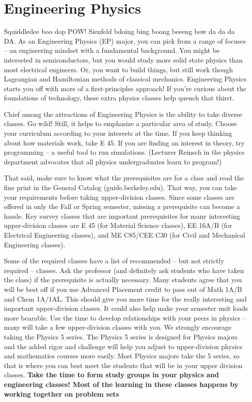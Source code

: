 \chapter*{Engineering Physics}

Squiddledee boo dop POW!  Sienfeld bdoing bing boong beeeng bow da da da DA.  As an Engineering Physics (EP) major, you can pick from a range of focuses – an engineering mindset with a fundamental background. You might be interested in semiconductors, but you would study more solid state physics than most electrical engineers. Or, you want to build things, but still work though Lagrangian and Hamiltonian methods of classical mechanics. Engineering Physics starts you off with more of a first-principles approach! If you’re curious about the foundations of technology, these extra physics classes help quench that thirst.

Chief among the attractions of Engineering Physics is the ability to take diverse classes. Go wild! Still, it helps to emphasize a particular area of study. Choose your curriculum according to your interests at the time. If you keep thinking about how materials work, take E 45. If you are finding an interest in theory, try programming – a useful tool to run simulations. (Lecturer Reinsch in the physics department advocates that all physics undergraduates learn to program!)

That said, make sure to know what the prerequisites are for a class and read the fine print in the General Catalog ({\selectfont guide.berkeley.edu}). That way, you can take your requirements before taking upper-division classes. Since some classes are offered in only the Fall or Spring semester, missing a prerequisite can become a hassle. Key survey classes that are important prerequisites for many interesting upper-division classes are E 45 (for Material Science classes), EE 16A/B (for Electrical Engineering classes), and ME C85/CEE C30 (for Civil and Mechanical Engineering classes).

Some of the required classes have a list of recommended – but not strictly required – classes. Ask the professor (and definitely ask students who have taken the class) if the prerequisite is actually necessary. Many students agree that you will be best off if you use Advanced Placement credit to pass out of Math 1A/B and Chem 1A/1AL. This should give you more time for the really interesting and important upper-division classes. It could also help make your semester unit loads more bearable. Use the time to develop relationships with your peers in physics – many will take a few upper-division classes with you. We strongly encourage taking the Physics 5 series. The Physics 5 series is designed for Physics majors and the added rigor and challenge will help you adjust to upper-division physics and mathematics courses more easily. Most Physics majors take the 5 series, so that is where you can best meet the students that will be in your upper division classes. \textbf{Take the time to form study groups in your physics and engineering classes! Most of the learning in these classes happens by working together on problem sets}

